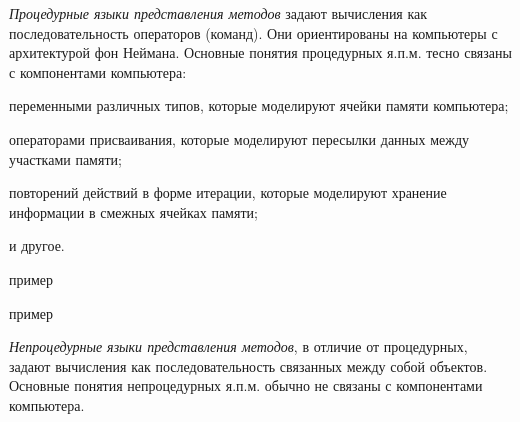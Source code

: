 \textit{Процедурные языки представления методов} задают вычисления как последовательность операторов (команд).
Они ориентированы на компьютеры с архитектурой фон Неймана. Основные понятия процедурных я.п.м. тесно связаны с компонентами компьютера:
\begin{textitemize}
    \item переменными различных типов, которые моделируют ячейки памяти компьютера;
    \item операторами присваивания, которые моделируют пересылки данных между участками памяти;
    \item повторений действий в форме итерации, которые моделируют хранение информации в смежных ячейках памяти;
    \item и другое.
\end{textitemize}

\begin{SCn}
\begin{scnindent}
    \begin{scnhaselementrolelist}{пример}
    \end{scnhaselementrolelist}
\end{scnindent}
\begin{scnindent}
    \begin{scnhaselementrolelist}{пример}
    \end{scnhaselementrolelist}
\end{scnindent}
\begin{scnindent}
\end{scnindent}
\end{SCn}

\textit{Непроцедурные языки представления методов}, в отличие от процедурных, задают вычисления как последовательность связанных между собой объектов. Основные понятия непроцедурных я.п.м. обычно не связаны с компонентами компьютера.

